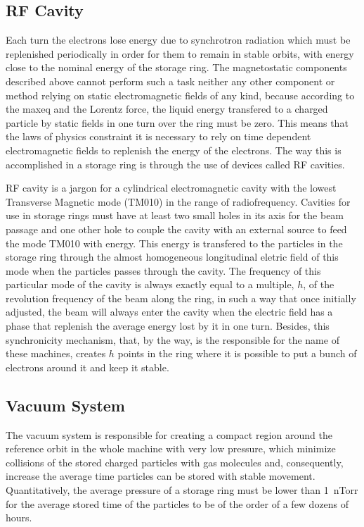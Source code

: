 \subsection{RF Cavity}

    Each turn the electrons lose energy due to synchrotron radiation which must be replenished periodically in order for them to remain in stable orbits, with energy close to the nominal energy of the storage ring. The magnetostatic components described above cannot perform such a task neither any other component or method relying on static electromagnetic fields of any kind, because according to the \gls{maxeq} and the Lorentz force, the liquid energy transfered to a charged particle by static fields in one turn over the ring must be zero. This means that the laws of physics constraint it is necessary to rely on time dependent electromagnetic fields to replenish the energy of the electrons. The way this is accomplished in a storage ring is through the use of devices called RF cavities.

    RF cavity is a jargon for a cylindrical electromagnetic cavity with the lowest Transverse Magnetic mode (TM010) in the range of radiofrequency. Cavities for use in storage rings must have at least two small holes in its axis for the beam passage and one other hole to couple the cavity with an external source to feed the mode TM010 with energy. This energy is transfered to the particles in the storage ring through the almost homogeneous longitudinal eletric field of this mode when the particles passes through the cavity. The frequency of this particular mode of the cavity is always exactly equal to a multiple, $h$, of the revolution frequency of the beam along the ring, in such a way that once initially adjusted, the beam will always enter the cavity when the electric field has a phase that replenish the average energy lost by it in one turn. Besides, this synchronicity mechanism, that, by the way, is the responsible for the name of these machines, creates $h$ points in the ring where it is possible to put a bunch of electrons around it and keep it stable.

\subsection{Vacuum System}

    The vacuum system is responsible for creating a compact region around the reference orbit in the whole machine with very low pressure, which minimize collisions of the stored charged particles with gas molecules and, consequently, increase the average time particles can be stored with stable movement. Quantitatively, the average pressure of a storage ring must be lower than \SI{1}{\nano Torr} for the average stored time of the particles to be of the order of a few dozens of hours.

